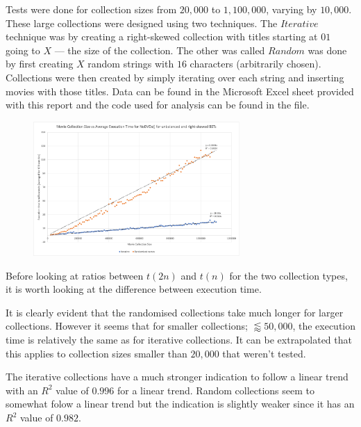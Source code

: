 \documentclass[a4paper]{article}
\begin{document}
\noindent
Tests were done for collection sizes from $20,000$ to $1,100,000$, varying by $10,000$. These large collections were designed using two techniques. The $Iterative$ technique was by creating a right-skewed collection with titles starting at $01$ going to $X$ --- the size of the collection. The other was called $Random$ was done by first creating $X$ random strings with $16$ characters (arbitrarily chosen). Collections were then created by simply iterating over each string and inserting movies with those titles. Data can be found in the Microsoft Excel sheet provided with this report and the code used for analysis can be found in the  file.
\vspace{3mm}
\pagebreak

\begin{figure}
    \raggedright
    \includegraphics[width=0.7\textwidth]{data/graph_time.png}
\end{figure}

\noindent
Before looking at ratios between $t(2n)$ and $t(n)$ for the two collection types, it is worth looking at the difference between execution time.

\vspace{3mm}
\noindent
It is clearly evident that the randomised collections take much longer for larger collections. However it seems that for smaller collections; $ \lessapprox 50,000$, the execution time is relatively the same as for iterative collections. It can be extrapolated that this applies to collection sizes smaller than $20,000$ that weren't tested. 
\vspace{3mm}

The iterative collections have a much stronger indication to follow a linear trend with an $R^2$ value of $0.996$ for a linear trend. Random collections seem to somewhat folow a linear trend but the indication is slightly weaker since it has an $R^2$ value of $0.982$. 
\vspace{3mm}
\end{document}
